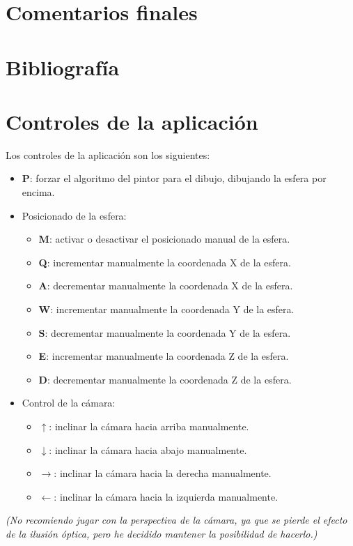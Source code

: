 \documentclass[a4paper,12pt]{article}
\begin{document}
\section{Comentarios finales}

\newpage
\section{Bibliografía}


\newpage
\appendix
\section{Controles de la aplicación}

Los controles de la aplicación son los siguientes:

\begin{itemize}
    \item \textbf{P}: forzar el algoritmo del pintor para el dibujo, dibujando la esfera por encima.
    \item Posicionado de la esfera:
    \begin{itemize}
        \item \textbf{M}: activar o desactivar el posicionado manual de la esfera.
        \item \textbf{Q}: incrementar manualmente la coordenada X de la esfera.
        \item \textbf{A}: decrementar manualmente la coordenada X de la esfera.
        \item \textbf{W}: incrementar manualmente la coordenada Y de la esfera.
        \item \textbf{S}: decrementar manualmente la coordenada Y de la esfera.
        \item \textbf{E}: incrementar manualmente la coordenada Z de la esfera.
        \item \textbf{D}: decrementar manualmente la coordenada Z de la esfera.
    \end{itemize}
    \item Control de la cámara:
    \begin{itemize}
        \item \textbf{$\uparrow$}: inclinar la cámara hacia arriba manualmente.
        \item \textbf{$\downarrow$}: inclinar la cámara hacia abajo manualmente.
        \item \textbf{$\rightarrow$}: inclinar la cámara hacia la derecha manualmente.
        \item \textbf{$\leftarrow$}: inclinar la cámara hacia la izquierda manualmente.
    \end{itemize}
\end{itemize}

\textit{(No recomiendo jugar con la perspectiva de la cámara, ya que se pierde el efecto de la ilusión óptica, pero he decidido mantener la posibilidad de hacerlo.)}
\end{document}

